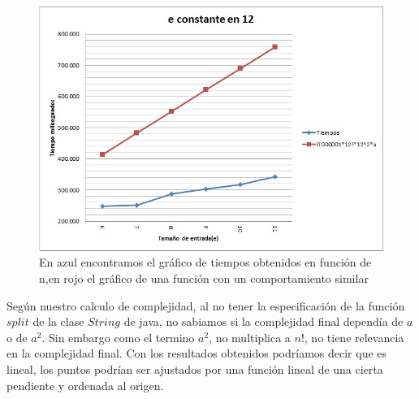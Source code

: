 \begin{figure}[H]
  \begin{center}
      \includegraphics[scale=0.75]{imagenes/GraficoEj3Ncte12.jpg}
  \end{center}
  \caption{En azul encontramos el gráfico de tiempos obtenidos en función de n,en rojo el gráfico de una función con un comportamiento similar}
  \label{nCte}
\end{figure}

Según nuestro calculo de complejidad, al no tener la especificación de la función $ split $ de la clase $ String $ de java, no sabiamos si la complejidad final dependía de $ a $ o de $a^2$. Sin embargo como el termino $a^2$, no multiplica a $ n! $, no tiene relevancia en la complejidad final. Con los resultados obtenidos podríamos decir que es lineal, los puntos podrían ser ajustados por una función lineal de una cierta pendiente y ordenada al origen.
